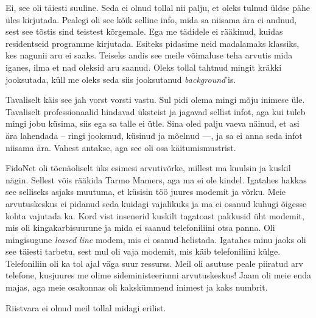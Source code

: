 
Ei, see oli täiesti suuline. Seda ei olnud tollal nii palju, et oleks tulnud üldse pähe üles 
kirjutada. Pealegi oli see kõik selline info, mida sa niisama ära ei 
andnud, sest see tõstis sind teistest kõrgemale. Ega me 
tädidele ei rääkinud, kuidas residentseid programme kirjutada. Esiteks
pidasime neid madalamaks klassiks, kes nagunii aru ei saaks. Teiseks andis see 
meile võimaluse teha arvutis mida iganes, ilma et nad oleksid aru
saanud. Oleks tollal tahtnud mingit kräkki jooksutada, küll me oleks seda siis
jooksutanud \emph{background}'is.


Tavaliselt käis see jah vorst vorsti vastu. Sul pidi olema mingi mõju 
inimese üle. Tavaliselt professionaalid hindavad üksteist ja jagavad sellist 
infot, aga kui tuleb mingi jobu küsima, siis ega sa talle ei ütle. Sina oled palju 
vaeva näinud, et asi ära lahendada -- ringi jooksnud, küsinud ja mõelnud ---, ja 
sa ei anna seda infot niisama ära. Vahest antakse, aga see oli osa 
käitumismustrist. 

FidoNet oli tõenäoliselt üks esimesi arvutivõrke, millest ma kuulsin ja kuskil 
nägin. Sellest võis rääkida Tarmo Mamers, aga ma ei ole kindel. Igatahes hakkas see selliseks asjaks muutuma, et 
küsisin töö juures modemit ja võrku. Meie 
arvutuskeskus ei pidanud seda kuidagi vajalikuks ja ma ei osanud kuhugi 
õigesse kohta vajutada ka. Kord vist insenerid kuskilt tagatoast 
pakkusid üht modemit, mis oli kingakarbisuurune ja mida ei saanud telefoniliini otsa panna. Oli mingisugune 
\emph{leased line} modem, mis ei osanud helistada. Igatahes 
minu jaoks oli see täiesti tarbetu, sest mul oli vaja modemit, mis käib 
telefoniliini külge. Telefoniliin oli ka tol ajal väga suur ressurss. Meil oli 
asutuse peale piiratud arv telefone, kusjuures me olime sideministeeriumi 
arvutuskeskus! Jaam oli meie enda majas, aga meie osakonnas oli kakskümmend 
inimest ja kaks numbrit. 


Riistvara ei olnud meil tollal midagi erilist.


